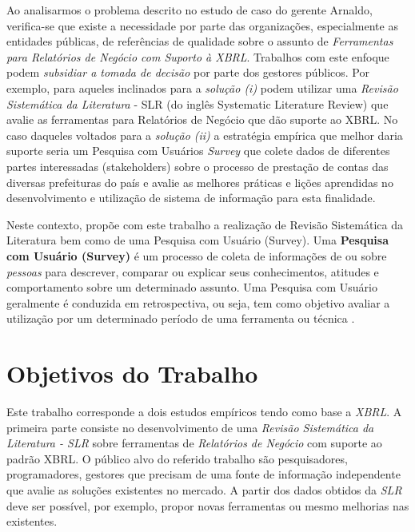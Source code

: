 \documentclass{article}
\begin{document}
Ao analisarmos o problema descrito no estudo de caso do gerente
Arnaldo, verifica-se que existe a necessidade por parte das
organizações, especialmente as entidades públicas, de referências de
qualidade sobre o assunto de \textit{Ferramentas para Relatórios de
  Negócio com Suporto à XBRL}. Trabalhos com este enfoque
podem \textit{subsidiar a tomada de decisão} por parte dos gestores
públicos. Por exemplo, para aqueles inclinados para a \textit{solução
  (i)} podem utilizar uma  \textit{Revisão Sistemática da
  Literatura} - SLR (do inglês Systematic Literature Review) que
avalie as ferramentas para Relatórios de Negócio que dão suporte ao
XBRL. No caso daqueles voltados para a  \textit{solução (ii)} a
estratégia empírica que melhor daria suporte seria um Pesquisa com Usuários
\textit{Survey} que colete dados de diferentes partes
interessadas (stakeholders) sobre o processo de prestação de contas
das diversas prefeituras do país e avalie as melhores práticas
e lições aprendidas no desenvolvimento e utilização de sistema de
informação para esta finalidade.

Neste contexto, propõe com este trabalho a realização de Revisão
Sistemática da Literatura bem como de uma Pesquisa com Usuário
(Survey). Uma \textbf{Pesquisa com Usuário (Survey)} é um processo de
coleta de informações de ou sobre
\textit{pessoas} para descrever, comparar ou explicar seus
conhecimentos, atitudes e comportamento sobre um determinado
assunto\cite{fink2003survey}. Uma Pesquisa com Usuário geralmente é conduzida em retrospectiva, ou seja, tem como
objetivo avaliar a utilização por um determinado período de uma
ferramenta ou técnica \cite{kitchenham2009systematic}.

\section{Objetivos do Trabalho}
\label{sec:objetivos}

Este trabalho corresponde a dois estudos empíricos tendo como base a \textit{XBRL}. A primeira parte consiste no
desenvolvimento de uma \textit{Revisão Sistemática da Literatura -
  SLR} sobre ferramentas de \textit{Relatórios de Negócio} com suporte ao
padrão XBRL. O público alvo do referido trabalho são pesquisadores,
programadores, gestores que precisam de uma fonte de informação
independente que avalie as soluções existentes no mercado. A partir
dos dados obtidos da \textit{SLR} deve ser possível, por exemplo, propor
novas ferramentas ou mesmo melhorias nas existentes.
\end{document}
